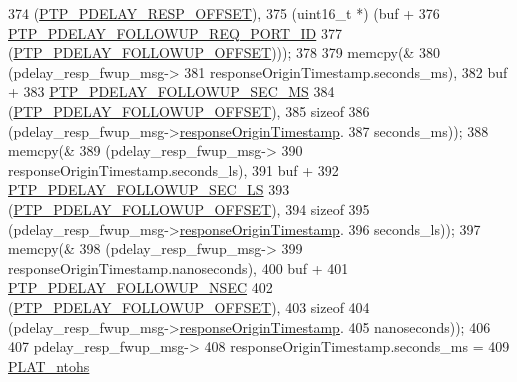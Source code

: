 \begin{DoxyCode}
{{{{{{{{374                          (\hyperlink{avbts__message_8hpp_a7c20f0e32d4408c124fa9e115ab32cf3}{PTP\_PDELAY\_RESP\_OFFSET}),
375                          (uint16\_t *) (buf +
376                                \hyperlink{avbts__message_8hpp_a255d563aa29bae40a58b1855d33155fc}{PTP\_PDELAY\_FOLLOWUP\_REQ\_PORT\_ID}
377                                (\hyperlink{avbts__message_8hpp_af0f41aa83b1011ea5b8c42abddd8cd50}{PTP\_PDELAY\_FOLLOWUP\_OFFSET})));
378 
379             memcpy(&
380                    (pdelay\_resp\_fwup\_msg->
381                 responseOriginTimestamp.seconds\_ms),
382                    buf +
383                    \hyperlink{avbts__message_8hpp_a64120f45af2cdc57df2a73e8867ec2dd}{PTP\_PDELAY\_FOLLOWUP\_SEC\_MS}
384                    (\hyperlink{avbts__message_8hpp_af0f41aa83b1011ea5b8c42abddd8cd50}{PTP\_PDELAY\_FOLLOWUP\_OFFSET}),
385                    \textcolor{keyword}{sizeof}
386                    (pdelay\_resp\_fwup\_msg->\hyperlink{class_p_t_p_message_path_delay_resp_follow_up_ace95ddb3f03eb3b4fcf8f73281dc0ee3}{responseOriginTimestamp}.
387                 seconds\_ms));
388             memcpy(&
389                    (pdelay\_resp\_fwup\_msg->
390                 responseOriginTimestamp.seconds\_ls),
391                    buf +
392                    \hyperlink{avbts__message_8hpp_a9a1f675eb7706c235c9d3bb050683da2}{PTP\_PDELAY\_FOLLOWUP\_SEC\_LS}
393                    (\hyperlink{avbts__message_8hpp_af0f41aa83b1011ea5b8c42abddd8cd50}{PTP\_PDELAY\_FOLLOWUP\_OFFSET}),
394                    \textcolor{keyword}{sizeof}
395                    (pdelay\_resp\_fwup\_msg->\hyperlink{class_p_t_p_message_path_delay_resp_follow_up_ace95ddb3f03eb3b4fcf8f73281dc0ee3}{responseOriginTimestamp}.
396                 seconds\_ls));
397             memcpy(&
398                    (pdelay\_resp\_fwup\_msg->
399                 responseOriginTimestamp.nanoseconds),
400                    buf +
401                    \hyperlink{avbts__message_8hpp_a405e85b9d79337d889c22e4b7959aa84}{PTP\_PDELAY\_FOLLOWUP\_NSEC}
402                    (\hyperlink{avbts__message_8hpp_af0f41aa83b1011ea5b8c42abddd8cd50}{PTP\_PDELAY\_FOLLOWUP\_OFFSET}),
403                    \textcolor{keyword}{sizeof}
404                    (pdelay\_resp\_fwup\_msg->\hyperlink{class_p_t_p_message_path_delay_resp_follow_up_ace95ddb3f03eb3b4fcf8f73281dc0ee3}{responseOriginTimestamp}.
405                 nanoseconds));
406 
407             pdelay\_resp\_fwup\_msg->
408                 responseOriginTimestamp.seconds\_ms =
409                 \hyperlink{linux_2src_2platform_8cpp_a6b8f3e7b87b66fa774a07ddc67f883a7}{PLAT\_ntohs}
}}}}}}}}
\end{DoxyCode}
